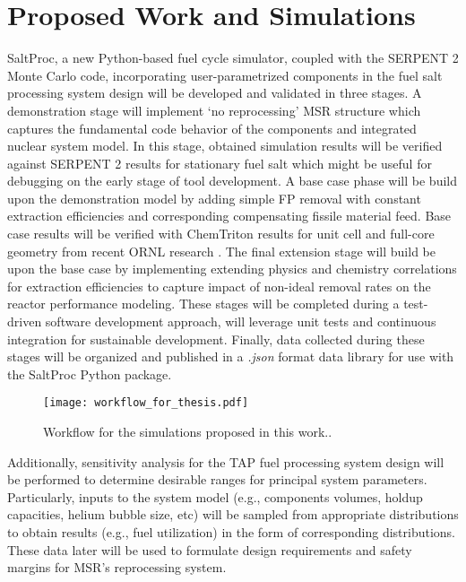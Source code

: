 \section{Proposed Work and Simulations}
SaltProc, a new Python-based fuel cycle simulator, coupled with
the SERPENT 2 Monte Carlo code, incorporating user-parametrized 
components in the fuel salt processing system design will be 
developed and validated in three stages. A demonstration stage will 
implement ‘no reprocessing’ \gls{MSR} structure which captures the 
fundamental code behavior of the components and integrated nuclear 
system model. In this stage, obtained simulation results will be 
verified against SERPENT 2 results for stationary fuel salt which 
might be useful for debugging on the early stage of tool development.
A base case phase will be build upon the demonstration model by 
adding simple \gls{FP} removal with constant extraction efficiencies 
and corresponding compensating fissile material feed. Base case 
results will be 
verified with ChemTriton results for unit cell and full-core 
geometry from recent \gls{ORNL} research 
\cite{betzler_two-dimensional_2016, betzler_assessment_2017}.
The final extension stage will build be upon the base case by 
implementing extending physics and chemistry correlations for 
extraction efficiencies to capture impact of non-ideal 
removal rates on the reactor performance modeling. These 
stages will be completed during a test-driven software 
development approach, will leverage unit tests and 
continuous integration for sustainable development. Finally, 
data collected during these stages will be organized and 
published in a \textit{.json} format data library for use 
with the SaltProc Python package.
\begin{figure}[ht!] %
  \centering
  \texttt{[image: workflow\_for\_thesis.pdf]} 
  \caption{Workflow for the simulations proposed in this work..}
  \label{fig:workflow}
\end{figure}

Additionally, sensitivity analysis for the \gls{TAP} fuel processing 
system design will be performed to determine desirable ranges 
for principal system parameters. Particularly, inputs to the 
system model (e.g., components volumes, holdup capacities, helium 
bubble size, etc) will be sampled from appropriate 
distributions to obtain results (e.g., fuel utilization) in the 
form of corresponding distributions. These data later will be used
to formulate design requirements and safety margins for 
\gls{MSR}'s reprocessing system.

